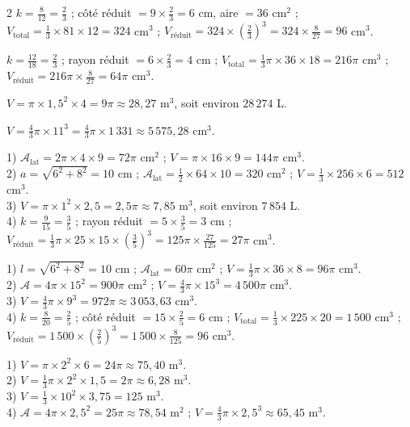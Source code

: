 \begin{multicols}{2}
$k=\frac{8}{12}=\frac23$ ; côté réduit $=9\times\frac23=6$ cm, aire $=36$ cm$^{2}$ ;
$V_{\text{total}}=\frac13\times81\times12=324$ cm$^{3}$ ;
$V_{\text{réduit}}=324\times\left(\frac23\right)^{3}=324\times\frac{8}{27}=96$ cm$^{3}$.

$k=\frac{12}{18}=\frac23$ ; rayon réduit $=6\times\frac23=4$ cm ;
$V_{\text{total}}=\frac13\pi\times36\times18=216\pi$ cm$^{3}$ ;
$V_{\text{réduit}}=216\pi\times\frac{8}{27}=64\pi$ cm$^{3}$.

$V=\pi\times1{,}5^{2}\times4=9\pi\approx28{,}27$ m$^{3}$, soit environ $28\,274$ L.

$V=\frac43\pi\times11^{3}=\frac43\pi\times1\,331\approx5\,575{,}28$ cm$^{3}$.

1) $\mathcal{A}_{\text{lat}}=2\pi\times4\times9=72\pi$ cm$^{2}$ ; $V=\pi\times16\times9=144\pi$ cm$^{3}$.\\
2) $a=\sqrt{6^{2}+8^{2}}=10$ cm ; $\mathcal{A}_{\text{lat}}=\frac12\times64\times10=320$ cm$^{2}$ ;
$V=\frac13\times256\times6=512$ cm$^{3}$.\\
3) $V=\pi\times1^{2}\times2{,}5=2{,}5\pi\approx7{,}85$ m$^{3}$, soit environ $7\,854$ L.\\
4) $k=\frac{9}{15}=\frac35$ ; rayon réduit $=5\times\frac35=3$ cm ; $V_{\text{réduit}}=\frac13\pi\times25\times15\times\left(\frac35\right)^{3}=125\pi\times\frac{27}{125}=27\pi$ cm$^{3}$.

1) $l=\sqrt{6^{2}+8^{2}}=10$ cm ; $\mathcal{A}_{\text{lat}}=60\pi$ cm$^{2}$ ; $V=\frac13\pi\times36\times8=96\pi$ cm$^{3}$.\\
2) $\mathcal{A}=4\pi\times15^{2}=900\pi$ cm$^{2}$ ; $V=\frac43\pi\times15^{3}=4\,500\pi$ cm$^{3}$.\\
3) $V=\frac43\pi\times9^{3}=972\pi\approx3\,053{,}63$ cm$^{3}$.\\
4) $k=\frac{8}{20}=\frac25$ ; côté réduit $=15\times\frac25=6$ cm ; $V_{\text{total}}=\frac13\times225\times20=1\,500$ cm$^{3}$ ;
$V_{\text{réduit}}=1\,500\times\left(\frac25\right)^{3}=1\,500\times\frac{8}{125}=96$ cm$^{3}$.

1) $V=\pi\times2^{2}\times6=24\pi\approx75{,}40$ m$^{3}$.\\
2) $V=\frac13\pi\times2^{2}\times1{,}5=2\pi\approx6{,}28$ m$^{3}$.\\
3) $V=\frac13\times10^{2}\times3{,}75=125$ m$^{3}$.\\
4) $\mathcal{A}=4\pi\times2{,}5^{2}=25\pi\approx78{,}54$ m$^{2}$ ; $V=\frac43\pi\times2{,}5^{3}\approx65{,}45$ m$^{3}$.

\end{multicols}
\exercicesBanner

